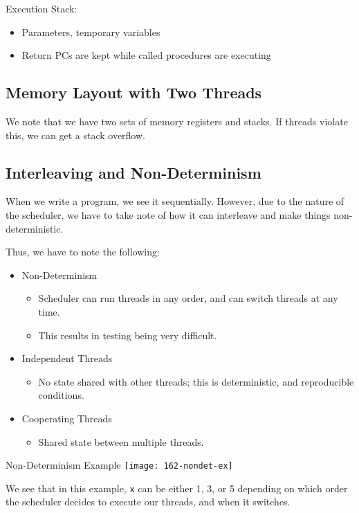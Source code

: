 \documentclass[openany]{book}
\begin{document}
Execution Stack:
\begin{itemize}
	\item Parameters, temporary variables
	\item Return PCs are kept while called procedures are executing
\end{itemize}

\subsection{Memory Layout with Two Threads}
We note that we have two sets of memory registers and stacks. If threads violate this, we can get a stack overflow.

\subsection{Interleaving and Non-Determinism}
When we write a program, we see it sequentially. However, due to the nature of the scheduler, we have to take note of how it can interleave and make things non-deterministic.

Thus, we have to note the following:
\begin{itemize}
	\item Non-Determinism
	\begin{itemize}
		\item Scheduler can run threads in any order, and can switch threads at any time.
		\item This results in testing being very difficult.
	\end{itemize}
	\item Independent Threads
	\begin{itemize}
		\item No state shared with other threads; this is deterministic, and reproducible conditions.
	\end{itemize}
	\item Cooperating Threads
	\begin{itemize}
		\item Shared state between multiple threads.
	\end{itemize}
\end{itemize}

\begin{figurebox}[]{Non-Determinism Example}
	\centering\texttt{[image: 162-nondet-ex]}
\end{figurebox}

We see that in this example, \texttt{x} can be either 1, 3, or 5 depending on which order the scheduler decides to execute our threads, and when it switches.
\end{document}
